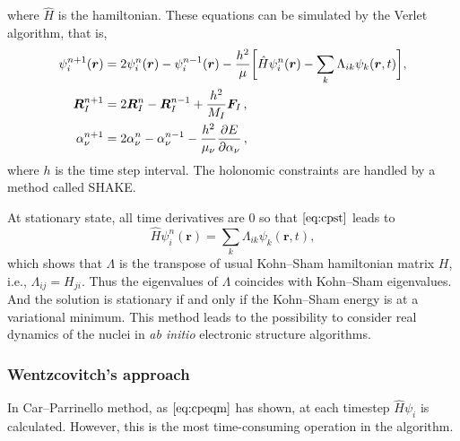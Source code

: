 where $\hat{H}$ is the hamiltonian.
These equations can be simulated by the Verlet algorithm, that is,
\begin{subequations}
	\label{eq:cpeqm}
	\begin{align}
		\psi_i ^{n+1} (\bm{r}) & = 2 \psi_{i} ^ {n} (\bm{r}) -
		\psi_i ^{n-1} (\bm{r}) - \frac{ h^2 }{ \mu }
		\bigg[
			\hat{H} \psi_{i} ^ {n} (\bm{r}) - \sum_{k}
			\Lambda_{ik} \psi_k (\bm{r}, t)
			\bigg],\label{eq:cpst}\\
		\bm{R}_{I}^{n+1}       & = 2 \bm{R}_{I}^{n} - \bm{R}_{I}^{n-1} +
		\frac{ h^2 }{ M_I } \bm{F}_{I} \thinspace,\\
		\alpha_{\nu}^{n+1}     & = 2 \alpha_{\nu}^{n} -
		\alpha_{\nu}^{n-1} -
		\frac{ h^2 }{ \mu_{\nu} }
		\frac{ \partial E }{ \partial \alpha_{\nu} } \thinspace,
	\end{align}
\end{subequations}
where $h$ is the time step interval. The holonomic constraints are
handled by a method called SHAKE.\cite{Ryckaert:1977gp}

At stationary state, all time derivatives are $0$ so that
$\eqref{eq:cpst}$ leads to
\begin{equation}
	\hat{H} \psi_{i} ^ {n} (\bm{r}) = \sum_{k}
	\Lambda_{ik} \psi_k (\bm{r}, t),
\end{equation}
which shows that $\Lambda$ is the transpose of
usual Kohn--Sham hamiltonian matrix
$H$, i.e., $\Lambda_{ij} = H_{ji}$. Thus the eigenvalues of
$\Lambda$ coincides with Kohn--Sham eigenvalues.
And the solution is stationary if and only if the Kohn--Sham
energy is at a variational minimum.\cite{martin2004electronic}
This method leads to the possibility to consider real dynamics
of the nuclei in \textit{ab initio} electronic structure algorithms.


\subsubsection{Wentzcovitch's approach}

In Car--Parrinello method, as $\eqref{eq:cpeqm}$ has shown,
at each timestep $\hat{H} \psi_i$ is calculated. However, this is
the most time-consuming operation in the algorithm.
